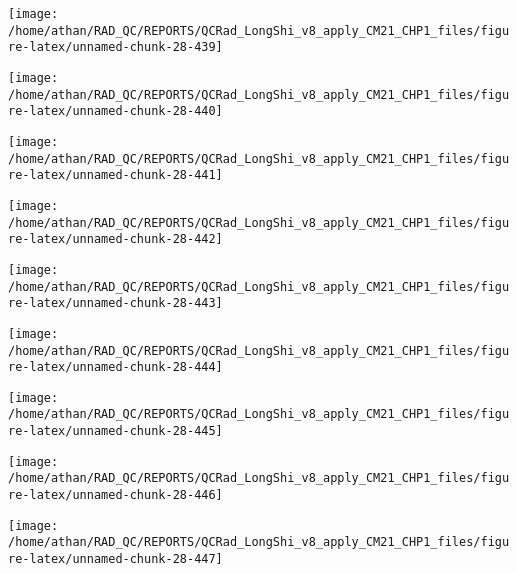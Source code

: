 \documentclass[
  10pt,
  a4paper,oneside]{article}
\begin{document}
\begin{center}\texttt{[image: /home/athan/RAD\_QC/REPORTS/QCRad\_LongShi\_v8\_apply\_CM21\_CHP1\_files/figure-latex/unnamed-chunk-28-439]} \end{center}

\begin{center}\texttt{[image: /home/athan/RAD\_QC/REPORTS/QCRad\_LongShi\_v8\_apply\_CM21\_CHP1\_files/figure-latex/unnamed-chunk-28-440]} \end{center}

\begin{center}\texttt{[image: /home/athan/RAD\_QC/REPORTS/QCRad\_LongShi\_v8\_apply\_CM21\_CHP1\_files/figure-latex/unnamed-chunk-28-441]} \end{center}

\begin{center}\texttt{[image: /home/athan/RAD\_QC/REPORTS/QCRad\_LongShi\_v8\_apply\_CM21\_CHP1\_files/figure-latex/unnamed-chunk-28-442]} \end{center}

\begin{center}\texttt{[image: /home/athan/RAD\_QC/REPORTS/QCRad\_LongShi\_v8\_apply\_CM21\_CHP1\_files/figure-latex/unnamed-chunk-28-443]} \end{center}

\begin{center}\texttt{[image: /home/athan/RAD\_QC/REPORTS/QCRad\_LongShi\_v8\_apply\_CM21\_CHP1\_files/figure-latex/unnamed-chunk-28-444]} \end{center}

\begin{center}\texttt{[image: /home/athan/RAD\_QC/REPORTS/QCRad\_LongShi\_v8\_apply\_CM21\_CHP1\_files/figure-latex/unnamed-chunk-28-445]} \end{center}

\begin{center}\texttt{[image: /home/athan/RAD\_QC/REPORTS/QCRad\_LongShi\_v8\_apply\_CM21\_CHP1\_files/figure-latex/unnamed-chunk-28-446]} \end{center}

\begin{center}\texttt{[image: /home/athan/RAD\_QC/REPORTS/QCRad\_LongShi\_v8\_apply\_CM21\_CHP1\_files/figure-latex/unnamed-chunk-28-447]} \end{center}
\end{document}
